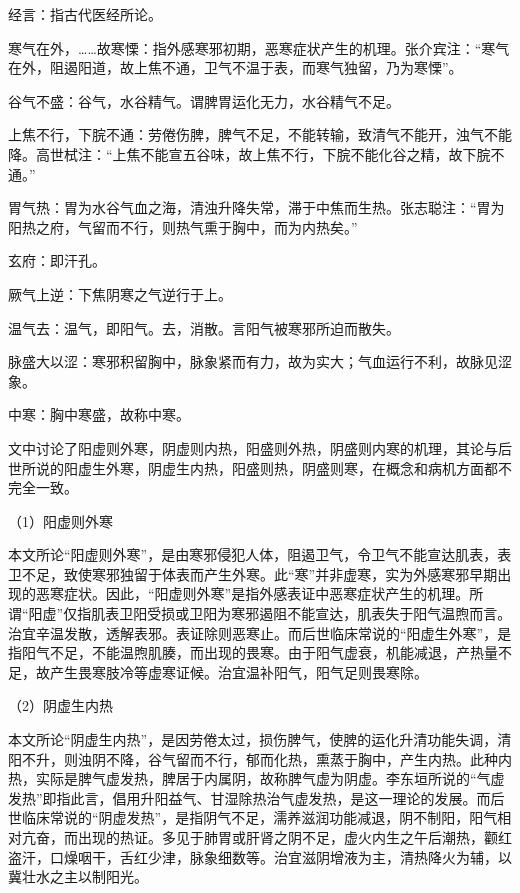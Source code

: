 \documentclass[draft,12pt]{ctexbook}
\begin{document}

\begin{jiaozhu}
	\item 经言：指古代医经所论。
	\item 寒气在外，……故寒慄：指外感寒邪初期，恶寒症状产生的机理。张介宾注：“寒气在外，阻遏阳道，故上焦不通，卫气不温于表，而寒气独留，乃为寒慄”。
	\item 谷气不盛：谷气，水谷精气。谓脾胃运化无力，水谷精气不足。
	\item 上焦不行，下脘不通：劳倦伤脾，脾气不足，不能转输，致清气不能开，浊气不能降。高世栻注：“上焦不能宣五谷味，故上焦不行，下脘不能化谷之精，故下脘不通。”
	\item 胃气热：胃为水谷气血之海，清浊升降失常，滞于中焦而生热。张志聪注：“胃为阳热之府，气留而不行，则热气熏于胸中，而为内热矣。”
	\item 玄府：即汗孔。
	\item 厥气上逆：下焦阴寒之气逆行于上。
	\item 温气去：温气，即阳气。去，消散。言阳气被寒邪所迫而散失。
	\item 脉盛大以涩：寒邪积留胸中，脉象紧而有力，故为实大；气血运行不利，故脉见涩象。
	\item 中寒：胸中寒盛，故称中寒。
\end{jiaozhu}



文中讨论了阳虚则外寒，阴虚则内热，阳盛则外热，阴盛则内寒的机理，其论与后世所说的阳虚生外寒，阴虚生内热，阳盛则热，阴盛则寒，在概念和病机方面都不完全一致。

（1）阳虚则外寒

本文所论“阳虚则外寒”，是由寒邪侵犯人体，阻遏卫气，令卫气不能宣达肌表，表卫不足，致使寒邪独留于体表而产生外寒。此“寒”并非虚寒，实为外感寒邪早期出现的恶寒症状。因此，“阳虚则外寒”是指外感表证中恶寒症状产生的机理。所谓“阳虚”仅指肌表卫阳受损或卫阳为寒邪遏阻不能宣达，肌表失于阳气温煦而言。治宜辛温发散，透解表邪。表证除则恶寒止。而后世临床常说的“阳虚生外寒”，是指阳气不足，不能温煦肌腠，而出现的畏寒。由于阳气虚衰，机能减退，产热量不足，故产生畏寒肢冷等虚寒证候。治宜温补阳气，阳气足则畏寒除。

（2）阴虚生内热

本文所论“阴虚生内热”，是因劳倦太过，损伤脾气，使脾的运化升清功能失调，清阳不升，则浊阴不降，谷气留而不行，郁而化热，熏蒸于胸中，产生内热。此种内热，实际是脾气虚发热，脾居于内属阴，故称脾气虚为阴虚。李东垣所说的“气虚发热”即指此言，倡用升阳益气、甘湿除热治气虚发热，是这一理论的发展。而后世临床常说的“阴虚发热”，是指阴气不足，濡养滋润功能减退，阴不制阳，阳气相对亢奋，而出现的热证。多见于肺胃或肝肾之阴不足，虚火内生之午后潮热，颧红盗汗，口燥咽干，舌红少津，脉象细数等。治宜滋阴增液为主，清热降火为辅，以冀壮水之主以制阳光。
\end{document}
